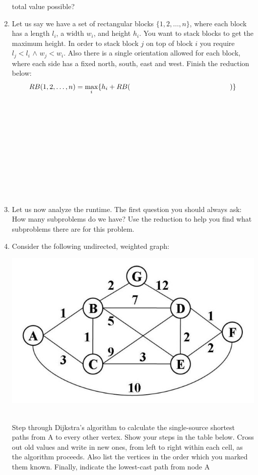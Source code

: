 \documentclass[12pt]{article}
\newcommand\tab[1][1cm]{\hspace*{#1}}
\begin{document}
\begin{enumerate}
total value possible?
\newpage
\item Let us say we have a set of rectangular blocks $\{1,2,\dots , n\}$, where each block has a length $l_i$,
a width $w_i$, and height $h_i$. You want to stack blocks to get the maximum height. In order to stack block $j$ on top of 
block $i$ you require $l_j < l_i$ $\land$ $w_j < w_i$. Also there is a single orientation allowed for each block, where each 
side has a fixed north, south, east and west.  Finish the reduction below:\\
$$RB(1,2,\dots , n) = \max_i\{h_i + RB(\tab[5cm])\}$$
\\\\\\\\\\\\\\\\\\\\
\item Let us now analyze the runtime. The first question you should always ask: How many subproblems do we have? Use the reduction to help you 
find what subproblems there are for this problem.
\newpage
\item Consider the following undirected, weighted graph:\\
\centerline{\includegraphics[scale = .7]{graph.jpg}}\\
Step through Dijkstra’s algorithm to calculate the single-source shortest 
paths from A to every other vertex. Show your steps in the table below. 
Cross out old values and write in new ones, from left to right within each 
cell, as the algorithm proceeds. Also list the vertices in the order which 
you marked them known. Finally, indicate the lowest-cast path from node A 

\end{enumerate}
\end{document}
